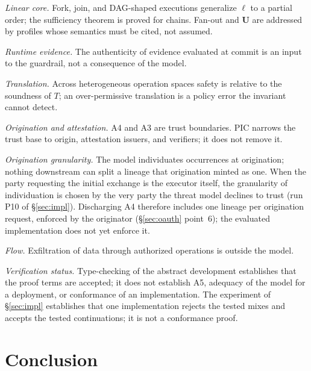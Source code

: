 \documentclass[conference]{IEEEtran}
\begin{document}
\emph{Linear core.} Fork, join, and DAG-shaped executions generalize $\ell$ to a partial order; the sufficiency theorem is proved for chains. Fan-out and $\mathbf{U}$ are addressed by profiles whose semantics must be cited, not assumed.

\emph{Runtime evidence.} The authenticity of evidence evaluated at commit is an input to the guardrail, not a consequence of the model.

\emph{Translation.} Across heterogeneous operation spaces safety is relative to the soundness of $T$; an over-permissive translation is a policy error the invariant cannot detect.

\emph{Origination and attestation.} A4 and A3 are trust boundaries. PIC narrows the trust base to origin, attestation issuers, and verifiers; it does not remove it.

\emph{Origination granularity.} The model individuates occurrences at origination; nothing downstream can split a lineage that origination minted as one. When the party requesting the initial exchange is the executor itself, the granularity of individuation is chosen by the very party the threat model declines to trust (run P10 of \S\ref{sec:impl}). Discharging A4 therefore includes one lineage per origination request, enforced by the originator (\S\ref{sec:oauth} point~6); the evaluated implementation does not yet enforce it.

\emph{Flow.} Exfiltration of data through authorized operations is outside the model.

\emph{Verification status.} Type-checking of the abstract development establishes that the proof terms are accepted; it does not establish A5, adequacy of the model for a deployment, or conformance of an implementation. The experiment of \S\ref{sec:impl} establishes that one implementation rejects the tested mixes and accepts the tested continuations; it is not a conformance proof.

\section{Conclusion}\label{sec:conclusion}
\end{document}

